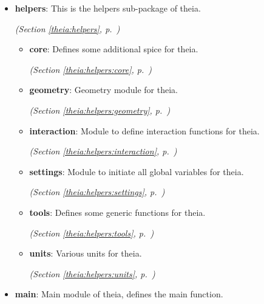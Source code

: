 \begin{itemize}
\setlength{\parskip}{0ex}
\item \textbf{helpers}: This is the helpers sub-package of theia.



  \textit{(Section \ref{theia:helpers}, p.~\pageref{theia:helpers})}

  \begin{itemize}
\setlength{\parskip}{0ex}
    \item \textbf{core}: Defines some additional spice for theia.



  \textit{(Section \ref{theia:helpers:core}, p.~\pageref{theia:helpers:core})}

    \item \textbf{geometry}: Geometry module for theia.



  \textit{(Section \ref{theia:helpers:geometry}, p.~\pageref{theia:helpers:geometry})}

    \item \textbf{interaction}: Module to define interaction functions for theia.



  \textit{(Section \ref{theia:helpers:interaction}, p.~\pageref{theia:helpers:interaction})}

    \item \textbf{settings}: Module to initiate all global variables for theia.



  \textit{(Section \ref{theia:helpers:settings}, p.~\pageref{theia:helpers:settings})}

    \item \textbf{tools}: Defines some generic functions for theia.



  \textit{(Section \ref{theia:helpers:tools}, p.~\pageref{theia:helpers:tools})}

    \item \textbf{units}: Various units for theia.



  \textit{(Section \ref{theia:helpers:units}, p.~\pageref{theia:helpers:units})}

  \end{itemize}
\item \textbf{main}: Main module of theia, defines the main function.




\end{itemize}
